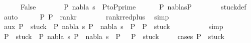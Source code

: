\begin{isabellebody}
\isanewline
\ \ \ \ \isamarkupfalse%
\ False\isanewline
\ \ \ \ \isamarkupfalse%
\ \isamarkupfalse%
\ P{\isacharprime}{\kern0pt}\ nabla\ s\ \ P{\isacharunderscore}{\kern0pt}to{\isacharunderscore}{\kern0pt}P{\isacharunderscore}{\kern0pt}prime{\isacharcolon}{\kern0pt}\isanewline
\ \ \ \ \ \ {\isachardoublequoteopen}P\ {\isasymTurnstile}{\isacharparenleft}{\kern0pt}nabla{\isacharcomma}{\kern0pt}s{\isacharparenright}{\kern0pt}{\isasymRightarrow}P{\isacharprime}{\kern0pt}{\isachardoublequoteclose}\isanewline
\ \ \ \ \ \ \isamarkupfalse%
\ stuck{\isacharunderscore}{\kern0pt}def\ \isamarkupfalse%
\ auto\isanewline
\ \ \ \ \isamarkupfalse%
\ {\isachardoublequoteopen}{\isacharparenleft}{\kern0pt}P{\isacharprime}{\kern0pt}{\isacharcomma}{\kern0pt}\ P{\isacharparenright}{\kern0pt}\ {\isasymin}\ rank{\isacharunderscore}{\kern0pt}r{\isachardoublequoteclose}\isanewline
\ \ \ \ \ \ \isamarkupfalse%
\ rank{\isacharunderscore}{\kern0pt}r{\isacharunderscore}{\kern0pt}red{\isacharunderscore}{\kern0pt}plus\ \isamarkupfalse%
\ simp\isanewline
\ \ \ \ \isamarkupfalse%
\ aux{\isacharcolon}{\kern0pt}\ {\isachardoublequoteopen}P{\isacharprime}{\kern0pt}\ {\isasymin}\ stuck\ {\isasymor}\ {\isacharparenleft}{\kern0pt}{\isasymexists}P{}\ nabla\ s{\isachardot}{\kern0pt}\ P{\isacharprime}{\kern0pt}\ {\isasymTurnstile}\ {\isacharparenleft}{\kern0pt}nabla{\isacharcomma}{\kern0pt}\ s{\isacharparenright}{\kern0pt}\ {\isasymRightarrow}\ P{}\ {\isasymand}\ P{}\ {\isasymin}\ stuck{\isacharparenright}{\kern0pt}{\isachardoublequoteclose}\isanewline
\ \ \ \ \ \ \isamarkupfalse%
\ {}\ \isamarkupfalse%
\ simp\isanewline
\ \ \ \ \isamarkupfalse%
\ \isamarkupfalse%
\ {\isachardoublequoteopen}P\ {\isasymin}\ stuck\ {\isasymor}\ {\isacharparenleft}{\kern0pt}{\isasymexists}P{}\ nabla\ s{\isachardot}{\kern0pt}\ P\ {\isasymTurnstile}\ {\isacharparenleft}{\kern0pt}nabla{\isacharcomma}{\kern0pt}\ s{\isacharparenright}{\kern0pt}\ {\isasymRightarrow}\ P{}\ \ {\isasymand}\ P{}\ {\isasymin}\ stuck{\isacharparenright}{\kern0pt}{\isachardoublequoteclose}\isanewline
\ \ \ \ \isamarkupfalse%
{\isacharparenleft}{\kern0pt}cases\ {\isachardoublequoteopen}P{\isacharprime}{\kern0pt}\ {\isasymin}\ stuck{\isachardoublequoteclose}{\isacharparenright}{\kern0pt}\isanewline

\end{isabellebody}
